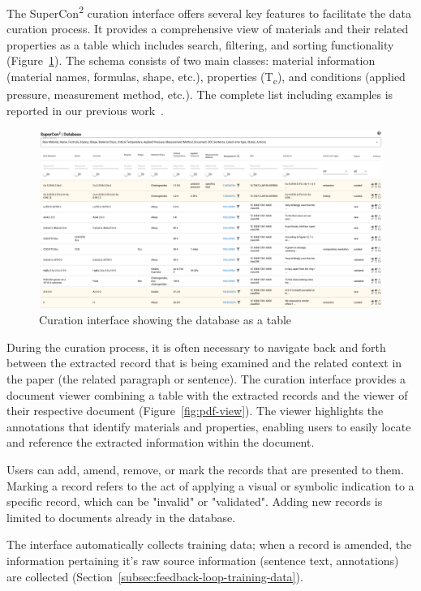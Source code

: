 \documentclass[a4paper]{article}
\begin{document}
The SuperCon\textsuperscript{2} curation interface offers several key features to facilitate the data curation process.
It provides a comprehensive view of materials and their related properties as a table which includes search, filtering, and sorting functionality (Figure~\ref{fig:curation-interface-database}). 
The schema consists of two main classes: material information (material names, formulas, shape, etc.), properties (T\textsubscript{c}), and conditions (applied pressure, measurement method, etc.). The complete list including examples is reported in our previous work~\cite{lfoppiano2023automatic}.

\begin{figure}[ht]
  \centering
  \includegraphics[width=1\textwidth]{images/supercon-curation-database} 
  \caption{Curation interface showing the database as a table}
  \label{fig:curation-interface-database}
\end{figure}


During the curation process, it is often necessary to navigate back and forth between the extracted record that is being examined and the related context in the paper (the related paragraph or sentence). 
The curation interface provides a document viewer combining a table with the extracted records and the viewer of their respective document (Figure~\ref{fig:pdf-view}). The viewer highlights the annotations that identify materials and properties, enabling users to easily locate and reference the extracted information within the document.

Users can add, amend, remove, or mark the records that are presented to them.  
Marking a record refers to the act of applying a visual or symbolic indication to a specific record, which can be "invalid" or "validated". 
Adding new records is limited to documents already in the database.

The interface automatically collects training data; when a record is amended, the information pertaining it's raw source information (sentence text, annotations) are collected (Section~\ref{subsec:feedback-loop-training-data}). 
\end{document}
